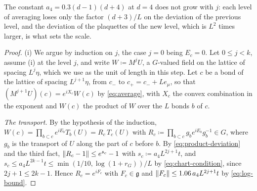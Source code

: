 \documentclass[11pt]{preprint}
\DeclarePairedDelimiter{\norm}{\lVert}{\rVert}
\numberwithin{equation}{section}
\theoremstyle{definition}
\theoremstyle{remark}
\theoremstyle{plain}
\begin{document}
The constant $a_4 = 0.3(d - 1)(d + 4)$ at $d = 4$ does not grow with $j$: each level of averaging loses only the factor $(d + 3)/L$ on the deviation of the previous level, and the deviation of the plaquettes of the new level, which is $L^2$ times larger, is what sets the scale.

\begin{proof}
(i) We argue by induction on $j$, the case $j = 0$ being $E_c = 0$. Let $0 \leq j < k$, assume (i) at the level $j$, and write $W \coloneqq M^jU$, a $G$-valued field on the lattice of spacing $L^j\eta$, which we use as the unit of length in this step. Let $c$ be a bond of the lattice of spacing $L^{j+1}\eta$, from $c_-$ to $c_+ = c_- + Le_\mu$, so that $(M^{j+1}U)(c) = e^{iX_c}W(c)$ by \eqref{eq:average}, with $X_c$ the convex combination in the exponent and $W(c)$ the product of $W$ over the $L$ bonds $b$ of $c$.

\emph{The transport.} By the hypothesis of the induction, $W(c) = \prod_{b \subset c}e^{iE_b}T_b(U) = R_c\,T_c(U)$ with $R_c \coloneqq \prod_{b \subset c}g_be^{iE_b}g_b^{-1} \in G$, where $g_b$ is the transport of $U$ along the part of $c$ before $b$. By \eqref{eq:product-deviation} and the third fact, $\norm{R_c - 1} \leq e^{s_c} - 1$ with $s_c \coloneqq a_4L^{2j+1}t$, and $s_c \leq a_4L^{2k-1}t \leq \min(1/10, \log(1 + r_G))/L$ by \eqref{eq:chart-condition}, since $2j + 1 \leq 2k - 1$. Hence $R_c = e^{iF_c}$ with $F_c \in \mathfrak g$ and $\norm{F_c} \leq 1.06\,a_4L^{2j+1}t$ by \eqref{eq:log-bound}.


\end{proof}
\end{document}
